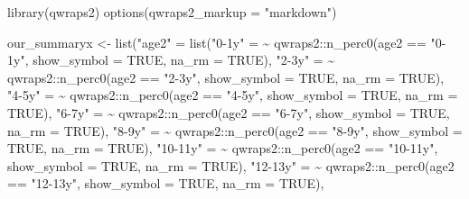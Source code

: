 \documentclass[
]{article}
\newenvironment{Shaded}{\begin{snugshade}}{\end{snugshade}}
\newcommand{\AttributeTok}[1]{\textcolor[rgb]{0.77,0.63,0.00}{#1}}
\newcommand{\ConstantTok}[1]{\textcolor[rgb]{0.00,0.00,0.00}{#1}}
\newcommand{\ErrorTok}[1]{\textcolor[rgb]{0.64,0.00,0.00}{\textbf{#1}}}
\newcommand{\FunctionTok}[1]{\textcolor[rgb]{0.00,0.00,0.00}{#1}}
\newcommand{\NormalTok}[1]{#1}
\newcommand{\OtherTok}[1]{\textcolor[rgb]{0.56,0.35,0.01}{#1}}
\newcommand{\SpecialCharTok}[1]{\textcolor[rgb]{0.00,0.00,0.00}{#1}}
\newcommand{\StringTok}[1]{\textcolor[rgb]{0.31,0.60,0.02}{#1}}
\begin{document}
\begin{Shaded}
\begin{Highlighting}[]
\FunctionTok{library}\NormalTok{(qwraps2)}
\FunctionTok{options}\NormalTok{(}\AttributeTok{qwraps2\_markup =} \StringTok{"markdown"}\NormalTok{)}

\NormalTok{our\_summaryx }\OtherTok{\textless{}{-}}
  \FunctionTok{list}\NormalTok{(}\StringTok{"age2"} \OtherTok{=} 
       \FunctionTok{list}\NormalTok{(}\StringTok{"0{-}1y"} \OtherTok{=} \ErrorTok{\textasciitilde{}}\NormalTok{ qwraps2}\SpecialCharTok{::}\FunctionTok{n\_perc0}\NormalTok{(age2 }\SpecialCharTok{==} \StringTok{"0{-}1y"}\NormalTok{, }\AttributeTok{show\_symbol =} \ConstantTok{TRUE}\NormalTok{, }\AttributeTok{na\_rm =} \ConstantTok{TRUE}\NormalTok{),}
            \StringTok{"2{-}3y"} \OtherTok{=} \ErrorTok{\textasciitilde{}}\NormalTok{ qwraps2}\SpecialCharTok{::}\FunctionTok{n\_perc0}\NormalTok{(age2 }\SpecialCharTok{==} \StringTok{"2{-}3y"}\NormalTok{, }\AttributeTok{show\_symbol =} \ConstantTok{TRUE}\NormalTok{, }\AttributeTok{na\_rm =} \ConstantTok{TRUE}\NormalTok{),}
            \StringTok{"4{-}5y"} \OtherTok{=} \ErrorTok{\textasciitilde{}}\NormalTok{ qwraps2}\SpecialCharTok{::}\FunctionTok{n\_perc0}\NormalTok{(age2 }\SpecialCharTok{==} \StringTok{"4{-}5y"}\NormalTok{, }\AttributeTok{show\_symbol =} \ConstantTok{TRUE}\NormalTok{, }\AttributeTok{na\_rm =} \ConstantTok{TRUE}\NormalTok{),}
            \StringTok{"6{-}7y"} \OtherTok{=} \ErrorTok{\textasciitilde{}}\NormalTok{ qwraps2}\SpecialCharTok{::}\FunctionTok{n\_perc0}\NormalTok{(age2 }\SpecialCharTok{==} \StringTok{"6{-}7y"}\NormalTok{, }\AttributeTok{show\_symbol =} \ConstantTok{TRUE}\NormalTok{, }\AttributeTok{na\_rm =} \ConstantTok{TRUE}\NormalTok{),}
            \StringTok{"8{-}9y"} \OtherTok{=} \ErrorTok{\textasciitilde{}}\NormalTok{ qwraps2}\SpecialCharTok{::}\FunctionTok{n\_perc0}\NormalTok{(age2 }\SpecialCharTok{==} \StringTok{"8{-}9y"}\NormalTok{, }\AttributeTok{show\_symbol =} \ConstantTok{TRUE}\NormalTok{, }\AttributeTok{na\_rm =} \ConstantTok{TRUE}\NormalTok{),}
            \StringTok{"10{-}11y"} \OtherTok{=} \ErrorTok{\textasciitilde{}}\NormalTok{ qwraps2}\SpecialCharTok{::}\FunctionTok{n\_perc0}\NormalTok{(age2 }\SpecialCharTok{==} \StringTok{"10{-}11y"}\NormalTok{, }\AttributeTok{show\_symbol =} \ConstantTok{TRUE}\NormalTok{, }\AttributeTok{na\_rm =} \ConstantTok{TRUE}\NormalTok{),}
            \StringTok{"12{-}13y"} \OtherTok{=} \ErrorTok{\textasciitilde{}}\NormalTok{ qwraps2}\SpecialCharTok{::}\FunctionTok{n\_perc0}\NormalTok{(age2 }\SpecialCharTok{==} \StringTok{"12{-}13y"}\NormalTok{, }\AttributeTok{show\_symbol =} \ConstantTok{TRUE}\NormalTok{, }\AttributeTok{na\_rm =} \ConstantTok{TRUE}\NormalTok{),}

\end{Highlighting}
\end{Shaded}
\end{document}
